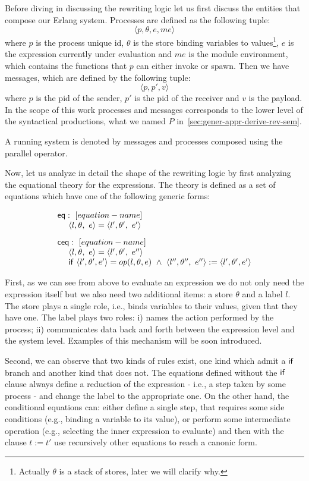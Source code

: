 \documentclass{article}[12pt,a4paper]
\theoremstyle{definition}
\begin{document}
Before diving in discussing the rewriting logic let us first
discuss the entities that compose our Erlang system.
Processes are defined as the following tuple:
\[\langle p, \theta, e, me \rangle\]
where $p$ is the process unique id, $\theta$ is the store binding variables to
values\footnote{Actually $\theta$ is a stack of stores, later we will clarify
  why. }, $e$ is the expression currently under evaluation and $me$ is the
module environment, which contains the functions that $p$ can either invoke or
spawn.
Then we have messages, which are defined by the following tuple:
\[\langle p, p', v \rangle\]
where $p$ is the pid of the sender, $p'$ is the pid of the receiver and $v$ is
the payload. In the scope of this work processes and messages corresponds to the
lower level of the syntactical productions, what we named $P$ in~\ref{sec:gener-appr-derive-rev-sem}.

A running system is denoted by messages and processes composed using the
parallel operator.

Now, let us analyze in detail the shape of the rewriting logic by first analyzing the equational theory for the expressions. The theory
is defined as a set of equations which have one of the following generic forms:

\[
  \begin{array}{l}
    \mathsf{eq}:~[equation-name]\\
    ~~~~\langle l,\theta,~e \rangle = \langle l',\theta',~e' \rangle\\[2ex]

    \mathsf{ceq}:~[equation-name]\\
    ~~~~\langle l,\theta,~e \rangle = \langle l',\theta',~e'' \rangle\\
    ~~~~\mathsf{if}~\langle l', \theta', e'\rangle =op(l,\theta,e)~\wedge~\langle
    l'',\theta'',~e'' \rangle := \langle l',\theta',e'\rangle

  \end{array}
\]

First, as we can see from above to evaluate an expression we do not only need
the expression itself but we also need two additional items:
a store $\theta$ and a label $l$. The store plays a single role, i.e., binds variables to their
values, given that they have one. The label plays two roles:
i) names the action performed by the process; ii) communicates data back and
forth between the expression level and the system level. Examples of this mechanism will be soon introduced.

Second, we can observe that two kinds of rules exist, one kind which admit a $\mathsf{if}$
branch and another kind that does not. The equations defined without the
$\mathsf{if}$ clause always define a reduction of the expression - i.e., a step
taken by some process - and change the label to
the appropriate one. On the other hand, the conditional equations can: either define a single
step, that requires some side conditions (e.g., binding a
variable to its value), or perform some
intermediate operation (e.g., selecting the inner expression to evaluate) and
then with the clause $t:=t'$ use recursively other equations to reach a canonic form.
\end{document}
